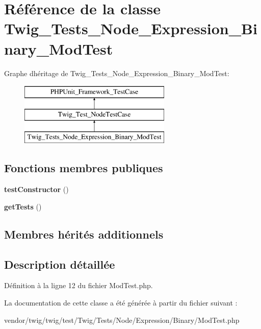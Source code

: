 \hypertarget{class_twig___tests___node___expression___binary___mod_test}{}\section{Référence de la classe Twig\+\_\+\+Tests\+\_\+\+Node\+\_\+\+Expression\+\_\+\+Binary\+\_\+\+Mod\+Test}
\label{class_twig___tests___node___expression___binary___mod_test}
Graphe d\textquotesingle{}héritage de Twig\+\_\+\+Tests\+\_\+\+Node\+\_\+\+Expression\+\_\+\+Binary\+\_\+\+Mod\+Test\+:\begin{figure}[H]
\begin{center}
\leavevmode
\includegraphics[height=3.000000cm]{class_twig___tests___node___expression___binary___mod_test}
\end{center}
\end{figure}
\subsection*{Fonctions membres publiques}
\begin{DoxyCompactItemize}
\item 
{\bfseries test\+Constructor} ()\hypertarget{class_twig___tests___node___expression___binary___mod_test_a47094dc941e72950570900d1418f89c6}{}\label{class_twig___tests___node___expression___binary___mod_test_a47094dc941e72950570900d1418f89c6}

\item 
{\bfseries get\+Tests} ()\hypertarget{class_twig___tests___node___expression___binary___mod_test_a7e247dd31cc8d37a6c97353a062a0080}{}\label{class_twig___tests___node___expression___binary___mod_test_a7e247dd31cc8d37a6c97353a062a0080}

\end{DoxyCompactItemize}
\subsection*{Membres hérités additionnels}


\subsection{Description détaillée}


Définition à la ligne 12 du fichier Mod\+Test.\+php.



La documentation de cette classe a été générée à partir du fichier suivant \+:\begin{DoxyCompactItemize}
\item 
vendor/twig/twig/test/\+Twig/\+Tests/\+Node/\+Expression/\+Binary/Mod\+Test.\+php\end{DoxyCompactItemize}
